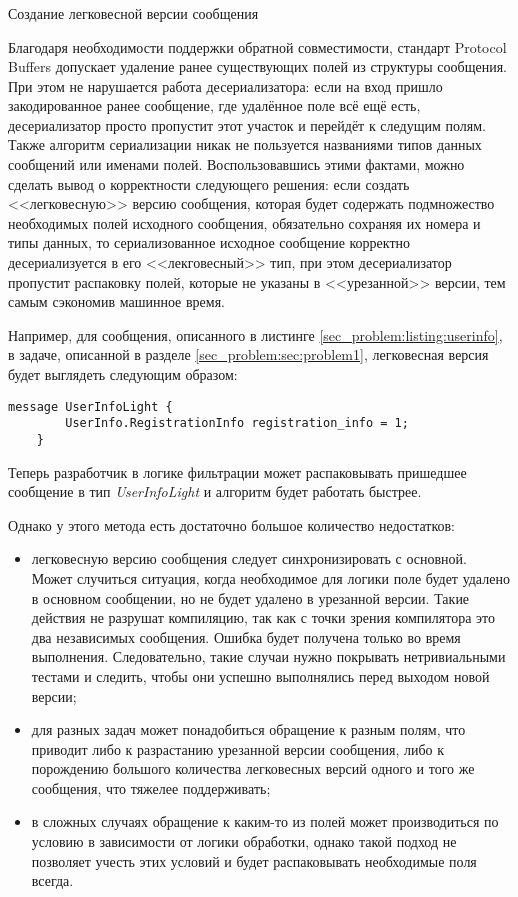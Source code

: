 \subsubsection{} Создание легковесной версии сообщения

Благодаря необходимости поддержки обратной совместимости, стандарт Protocol Buffers допускает удаление ранее существующих полей из структуры сообщения.
При этом не нарушается работа десериализатора: если на вход пришло закодированное ранее сообщение, где удалённое поле всё ещё есть, десериализатор просто пропустит
этот участок и перейдёт к следущим полям. 
Также алгоритм сериализации никак не пользуется названиями типов данных сообщений или именами полей.
Воспользовавшись этими фактами, можно сделать вывод о корректности следующего решения: если создать <<легковесную>> версию сообщения, которая будет содержать подмножество
необходимых полей исходного сообщения, обязательно сохраняя их номера и типы данных, то сериализованное исходное сообщение корректно десериализуется в его <<лекговесный>>
тип, при этом десериализатор пропустит распаковку полей, которые не указаны в <<урезанной>> версии, тем самым сэкономив машинное время.

Например, для сообщения, описанного в листинге \ref{sec_problem:listing:userinfo}, в задаче, описанной в 
разделе \ref{sec_problem:sec:problem1}, легковесная версия будет выглядеть следующим образом:
\begin{lstlisting}[style=CodeListing]
    message UserInfoLight {
        UserInfo.RegistrationInfo registration_info = 1;
    }
\end{lstlisting}

Теперь разработчик в логике фильтрации может распаковывать пришедшее сообщение в тип \textit{UserInfoLight} и алгоритм будет работать быстрее.

Однако у этого метода есть достаточно большое количество недостатков:
\begin{itemize}
    \item легковесную версию сообщения следует синхронизировать с основной. Может случиться ситуация, когда необходимое для логики поле будет удалено в основном сообщении, но не будет удалено в урезанной версии. Такие действия не разрушат компиляцию, так как с точки зрения компилятора это два независимых сообщения. Ошибка будет получена только во время выполнения. Следовательно, такие случаи нужно покрывать нетривиальными тестами и следить, чтобы они успешно выполнялись перед выходом новой версии;
    \item для разных задач может понадобиться обращение к разным полям, что приводит либо к разрастанию урезанной версии сообщения, либо к порождению большого количества легковесных версий одного и того же сообщения, что тяжелее поддерживать;
    \item в сложных случаях обращение к каким-то из полей может производиться по условию в зависимости от логики обработки, однако такой подход не позволяет учесть этих условий и будет распаковывать необходимые поля всегда.
\end{itemize}

